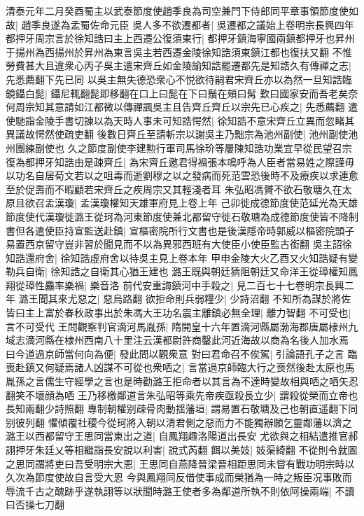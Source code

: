 清泰元年二月癸酉蜀主以武泰節度使趙季良為司空兼門下侍郎同平章事領節度使如故|{
	趙季良遂為孟蜀佐命元臣}
吳人多不欲遷都者|{
	吳遷都之議始上卷明宗長興四年}
都押牙周宗言於徐知誥曰主上西遷公復須東行|{
	都押牙鎮海寧國兩鎮都押牙也昇州于揚州為西揚州於昇州為東言吳主若西遷金陵徐知誥須東鎮江都也復扶又翻}
不惟勞費甚大且違衆心丙子吳主遣宋齊丘如金陵諭知誥罷遷都先是知誥久有傳禪之志|{
	先悉薦翻下先已同}
以吳主無失德恐衆心不悦欲待嗣君宋齊丘亦以為然一旦知誥臨鏡鑷白髭|{
	鑷尼輒翻髭即移翻在口上曰髭在下曰鬚在頰曰髯}
歎曰國家安而吾老矣奈何周宗知其意請如江都微以傳禪諷吳主且告齊丘齊丘以宗先已心疾之|{
	先悉薦翻}
遣使馳詣金陵手書切諫以為天時人事未可知誥愕然|{
	徐知誥不意宋齊丘立異而忽睹其異議故愕然使疏吏翻}
後數日齊丘至請斬宗以謝吳主乃黜宗為池州副使|{
	池州副使池州團練副使也}
久之節度副使李建勲行軍司馬徐玠等屢陳知誥功業宜早從民望召宗復為都押牙知誥由是疎齊丘|{
	為宋齊丘邀君得禍張本鳴呼為人臣者當易姓之際謹毋以功名自居荀文若以之咀毒而逝劉穆之以之發病而死范雲恐後時不及療疾以求連愈至於促壽而不暇顧若宋齊丘之疾周宗又其輕淺者耳}
朱弘昭馮贇不欲石敬瑭久在太原且欲召孟漢瓊|{
	孟漢瓊權知天雄軍府見上卷上年}
己卯徙成德節度使范延光為天雄節度使代漢瓊徙潞王從珂為河東節度使兼北都留守徙石敬瑭為成德節度使皆不降制書但各遣使臣持宣監送赴鎮|{
	宣樞密院所行文書也是後漢隱帝時郭威以樞密院頭子易置西京留守豈非習於聞見而不以為異邪西班有大使臣小使臣監古銜翻}
吳主詔徐知誥還府舍|{
	徐知誥虛府舍以待吳主見上卷本年}
甲申金陵大火乙酉又火知誥疑有變勒兵自衛|{
	徐知誥之自衛其心猶王建也}
潞王既與朝廷猜阻朝廷又命洋王從璋權知鳳翔從璋性麤率樂禍|{
	樂音洛}
前代安重誨鎮河中手殺之|{
	見二百七十七卷明宗長興二年}
潞王聞其來尤惡之|{
	惡烏路翻}
欲拒命則兵弱糧少|{
	少詩沼翻}
不知所為謀於將佐皆曰主上富於春秋政事出於朱馮大王功名震主離鎮必無全理|{
	離力智翻}
不可受也|{
	言不可受代}
王問觀察判官滴河馬胤孫|{
	隋開皇十六年置滴河縣屬渤海郡唐屬棣州九域志滴河縣在棣州西南八十里注云漢都尉許商鑿此河近海故以商為名後人加水焉}
曰今道過京師當何向為便|{
	發此問以觀衆意}
對曰君命召不俟駕|{
	引論語孔子之言}
臨喪赴鎮又何疑焉諸人凶謀不可從也衆哂之|{
	言當過京師臨大行之喪然後赴太原也馬胤孫之言儒生守經學之言也是時勸潞王拒命者以其言為不達時變故相與哂之哂矢忍翻笑不壞顔為哂}
王乃移檄鄰道言朱弘昭等乘先帝疾亟殺長立少|{
	謂殺從榮而立帝也長知兩翻少詩照翻}
專制朝權别疎骨肉動揺藩垣|{
	謂易置石敬瑭及己也朝直遥翻下同别彼列翻}
懼傾覆社稷今從珂將入朝以清君側之惡而力不能獨辦願乞靈鄰藩以濟之潞王以西都留守王思同當東出之道|{
	自鳳翔趣洛陽道出長安}
尤欲與之相結遣推官郝詡押牙朱廷乂等相繼詣長安說以利害|{
	說式芮翻}
餌以美妓|{
	妓渠綺翻}
不從則令就圖之思同謂將吏曰吾受明宗大恩|{
	王思同自燕降晉梁晉相距思同未嘗有戰功明宗時以久次為節度使故自言受大恩}
今與鳳翔同反借使事成而榮猶為一時之叛臣况事敗而辱流千古之醜跡乎遂執詡等以狀聞時潞王使者多為鄰道所執不則依阿操兩端|{
	不讀曰否操七刀翻}
